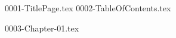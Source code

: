 \documentclass[a4paper,11pt]{book}
\begin{document}
\frontmatter 

{0001-TitlePage.tex}
{0002-TableOfContents.tex}

\mainmatter

{0003-Chapter-01.tex}

\backmatter 

\end{document}
